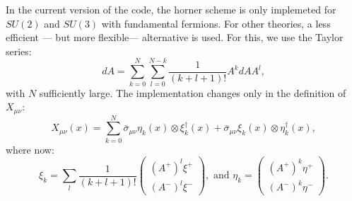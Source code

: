 \documentclass[12pt]{article}
\begin{document}
In the current version of  the code, the horner scheme is only implemeted for $SU(2)$ and $SU(3)$ with fundamental fermions. For other theories, a less efficient  --- but more flexible--- alternative is used. For this, we use the Taylor series:
\begin{equation}
dA = \sum_{k=0}^N \sum_{l=0}^{N-k} \frac{1}{(k+l+1)!} A^{k} dA A^{l},
\end{equation}
with $N$ sufficiently large. The implementation changes only in the definition of $X_{\mu\nu}$:
\begin{equation}
 X_{\mu\nu}(x) = \sum_{k=0}^N \bar{\sigma}_{\mu\nu}\eta_k(x)\otimes\xi_k^\dagger(x) + \bar{\sigma}_{\mu\nu}\xi_k(x)\otimes\eta_k^\dagger(x),
\end{equation}
where now:
\begin{equation}
\xi_k = \sum_l \frac{1}{(k+l+1)!} \begin{pmatrix}
(A^+)^l \xi^+ \\
 (A^-)^l \xi^-
\end{pmatrix}, \text{ and }
\eta_k =  \begin{pmatrix}
 (A^+)^k \eta^+ \\
(A^-)^k \eta^-
\end{pmatrix}.
\end{equation}
\end{document}
